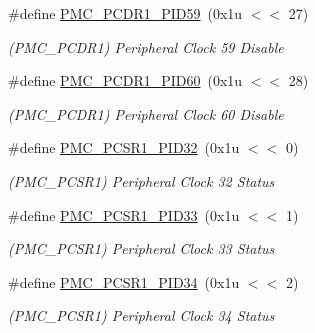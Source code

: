 \begin{DoxyCompactItemize}
\mbox{\label{group__SAMV71__PMC_ga644853bb7606a41cfa75dabbddd0b322}} 
\#define \mbox{\hyperlink{group__SAMV71__PMC_ga644853bb7606a41cfa75dabbddd0b322}{P\+M\+C\+\_\+\+P\+C\+D\+R1\+\_\+\+P\+I\+D59}}~(0x1u $<$$<$ 27)
\begin{DoxyCompactList}\small\item\em (P\+M\+C\+\_\+\+P\+C\+D\+R1) Peripheral Clock 59 Disable \end{DoxyCompactList}\item 
\mbox{\label{group__SAMV71__PMC_gae56a89ab61dd2b17093818fb910ae4cb}} 
\#define \mbox{\hyperlink{group__SAMV71__PMC_gae56a89ab61dd2b17093818fb910ae4cb}{P\+M\+C\+\_\+\+P\+C\+D\+R1\+\_\+\+P\+I\+D60}}~(0x1u $<$$<$ 28)
\begin{DoxyCompactList}\small\item\em (P\+M\+C\+\_\+\+P\+C\+D\+R1) Peripheral Clock 60 Disable \end{DoxyCompactList}\item 
\mbox{\label{group__SAMV71__PMC_gac91dd4748028ff9dad647ff84b3acbbc}} 
\#define \mbox{\hyperlink{group__SAMV71__PMC_gac91dd4748028ff9dad647ff84b3acbbc}{P\+M\+C\+\_\+\+P\+C\+S\+R1\+\_\+\+P\+I\+D32}}~(0x1u $<$$<$ 0)
\begin{DoxyCompactList}\small\item\em (P\+M\+C\+\_\+\+P\+C\+S\+R1) Peripheral Clock 32 Status \end{DoxyCompactList}\item 
\mbox{\label{group__SAMV71__PMC_gaeff1666f3a8f372b6af6bc8af62dacc6}} 
\#define \mbox{\hyperlink{group__SAMV71__PMC_gaeff1666f3a8f372b6af6bc8af62dacc6}{P\+M\+C\+\_\+\+P\+C\+S\+R1\+\_\+\+P\+I\+D33}}~(0x1u $<$$<$ 1)
\begin{DoxyCompactList}\small\item\em (P\+M\+C\+\_\+\+P\+C\+S\+R1) Peripheral Clock 33 Status \end{DoxyCompactList}\item 
\mbox{\label{group__SAMV71__PMC_ga8fe23cc1946583f4a447c6299cc61288}} 
\#define \mbox{\hyperlink{group__SAMV71__PMC_ga8fe23cc1946583f4a447c6299cc61288}{P\+M\+C\+\_\+\+P\+C\+S\+R1\+\_\+\+P\+I\+D34}}~(0x1u $<$$<$ 2)
\begin{DoxyCompactList}\small\item\em (P\+M\+C\+\_\+\+P\+C\+S\+R1) Peripheral Clock 34 Status \end{DoxyCompactList}\item 
$$
\end{DoxyCompactItemize}
